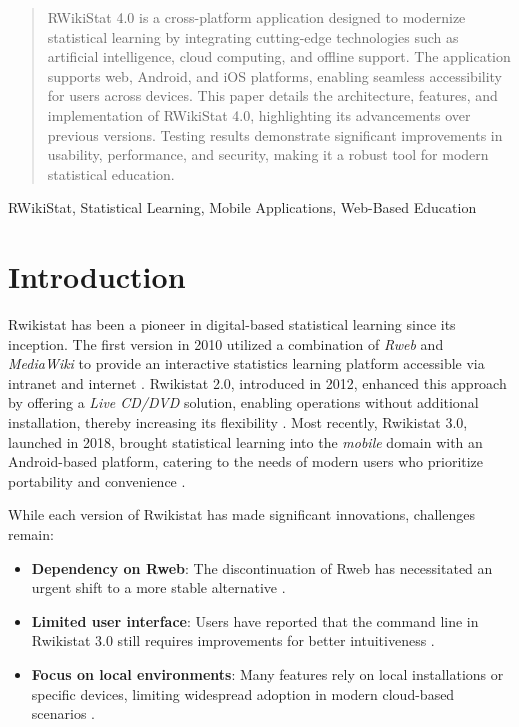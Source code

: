 \documentclass[conference,a4paper]{IEEEtran}
\begin{document}
\maketitle

\begin{abstract}
  RWikiStat 4.0 is a cross-platform application designed to modernize statistical
  learning by integrating cutting-edge technologies such as artificial
  intelligence, cloud computing, and offline support. The application supports
  web, Android, and iOS platforms, enabling seamless accessibility for users
  across devices. This paper details the architecture, features, and
  implementation of RWikiStat 4.0, highlighting its advancements over previous
  versions. Testing results demonstrate significant improvements in usability,
  performance, and security, making it a robust tool for modern statistical
  education.
\end{abstract}

\begin{IEEEkeywords}
  RWikiStat, Statistical Learning, Mobile Applications, Web-Based Education
\end{IEEEkeywords}

\section{Introduction}
\label{sect:introduction}

Rwikistat has been a pioneer in digital-based statistical learning since its
inception. The first version in 2010 utilized a combination of \textit{Rweb}
and \textit{MediaWiki} to provide an interactive statistics learning platform
accessible via intranet and internet \cite{b1}. Rwikistat 2.0, introduced in
2012, enhanced this approach by offering a \textit{Live CD/DVD} solution,
enabling operations without additional installation, thereby increasing its
flexibility \cite{b2}. Most recently, Rwikistat 3.0, launched in 2018, brought
statistical learning into the \textit{mobile} domain with an Android-based
platform, catering to the needs of modern users who prioritize portability and
convenience \cite{b3}.

While each version of Rwikistat has made significant innovations, challenges
remain:
\begin{itemize}
  \item \textbf{Dependency on Rweb}: The discontinuation of Rweb has necessitated an urgent shift to a more stable alternative \cite{b2,b3}.
  \item \textbf{Limited user interface}: Users have reported that the command line in Rwikistat 3.0 still requires improvements for better intuitiveness \cite{b3}.
  \item \textbf{Focus on local environments}: Many features rely on local installations or specific devices, limiting widespread adoption in modern cloud-based scenarios \cite{b2}.
\end{itemize}
\end{document}
